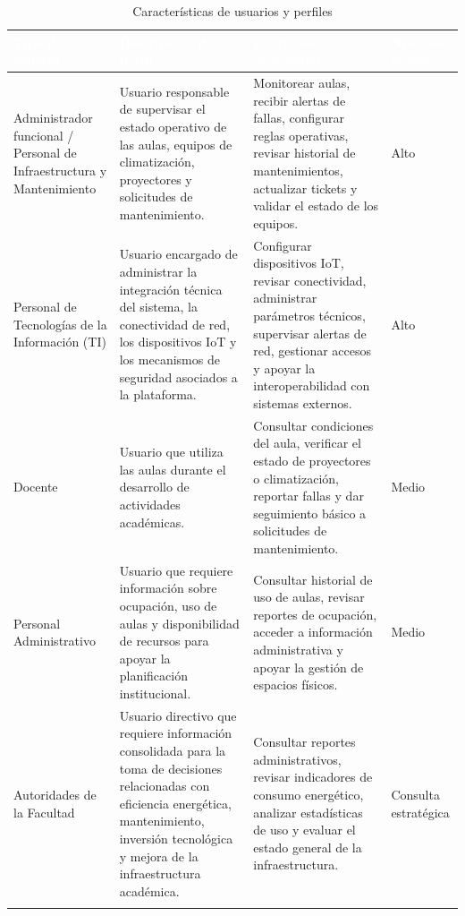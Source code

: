\begingroup
\small
\begin{longtable}{|p{3.9cm}|p{3.9cm}|p{3.9cm}|p{3.9cm}|}
\hline
\cellcolor{sigagreen}\textcolor{white}{\textbf{Tipo de usuario}} & \cellcolor{sigagreen}\textcolor{white}{\textbf{Descripción del perfil}} & \cellcolor{sigagreen}\textcolor{white}{\textbf{Funciones principales}} & \cellcolor{sigagreen}\textcolor{white}{\textbf{Nivel de acceso}} \\ \hline
Administrador funcional / Personal de Infraestructura y Mantenimiento & Usuario responsable de supervisar el estado operativo de las aulas, equipos de climatización, proyectores y solicitudes de mantenimiento. & Monitorear aulas, recibir alertas de fallas, configurar reglas operativas, revisar historial de mantenimientos, actualizar tickets y validar el estado de los equipos. & Alto \\ \hline
Personal de Tecnologías de la Información (TI) & Usuario encargado de administrar la integración técnica del sistema, la conectividad de red, los dispositivos IoT y los mecanismos de seguridad asociados a la plataforma. & Configurar dispositivos IoT, revisar conectividad, administrar parámetros técnicos, supervisar alertas de red, gestionar accesos y apoyar la interoperabilidad con sistemas externos. & Alto \\ \hline
Docente & Usuario que utiliza las aulas durante el desarrollo de actividades académicas. & Consultar condiciones del aula, verificar el estado de proyectores o climatización, reportar fallas y dar seguimiento básico a solicitudes de mantenimiento. & Medio \\ \hline
Personal Administrativo & Usuario que requiere información sobre ocupación, uso de aulas y disponibilidad de recursos para apoyar la planificación institucional. & Consultar historial de uso de aulas, revisar reportes de ocupación, acceder a información administrativa y apoyar la gestión de espacios físicos. & Medio \\ \hline
Autoridades de la Facultad & Usuario directivo que requiere información consolidada para la toma de decisiones relacionadas con eficiencia energética, mantenimiento, inversión tecnológica y mejora de la infraestructura académica. & Consultar reportes administrativos, revisar indicadores de consumo energético, analizar estadísticas de uso y evaluar el estado general de la infraestructura. & Consulta estratégica \\ \hline
\caption{Características de usuarios y perfiles}
\end{longtable}
\endgroup

